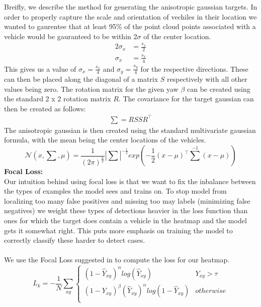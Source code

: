 \documentclass[letter]{article}
\begin{document}
	Breifly, we describe the method for generating the anisotropic gaussian targets. In order to properly capture the scale and orientation of vechiles in their location we wanted to gaurentee that at least 95\% of the point cloud points associated with a vehicle would be gauranteed to be within $2\sigma$ of the center location.
	\begin{align}
            2 \sigma_x &= \frac{s_x}{2}\\
			\sigma_x &= \frac{s_x}{4}
	\end{align}
	This gives us a value of $\sigma_x = \frac{s_x}{4}$ and $\sigma_y = \frac{s_y}{4}$ for the respective directions. These can then be placed along the diagonal of a matrix $S$ respectively with all other values being zero. The rotation matrix for the given yaw $\beta$ can be created using the standard 2 x 2 rotation matrix $R$. The covariance for the target gaussian can then be created as follows:
	\begin{align}
		\textstyle \sum = R S S R^\top
	\end{align}
	The anisotropic gaussian is then created using the standard multivariate gaussian formula, with the mean being the center locations of the vehicles.
	\begin{equation}
		\mathcal{N}(x, \textstyle \sum, \mu) = \frac{1}{(2\pi)^\frac{n}{2}}|\textstyle \sum|^{-\frac{1}{2}} exp (-\frac{1}{2}(x-\mu)^\top \textstyle \sum^{-1}(x - \mu))
	\end{equation}
	\textbf{Focal Loss:}\\
	Our intuition behind using focal loss is that we want to fix the inbalance between the types of examples the model sees and trains on. To stop model from localizing too many false positives and missing too may labels (minimizing false negatives) we weight these types of detections heavier in the loss function than ones for which the target does contain a vehicle in the heatmap and the model gets it somewhat right. This puts more emphasis on training the model to correctly classify these harder to detect cases.\\\\
	We use the Focal Loss suggested in \cite{objects-as-points} to compute the loss for our heatmap.
	\begin{equation}
		L_k = -\frac{1}{N} \sum_{xy} 
		\begin{cases} 
			(1 - \hat{Y}_{xy})^\alpha log (\hat{Y}_{xy}) & Y_{xy} > \tau\\
			(1 - Y_{xy})^\beta (\hat{Y}_{xy})^\alpha log(1 - \hat{Y}_{xy})& otherwise \\
		 \end{cases}
	\end{equation}
\end{document}
